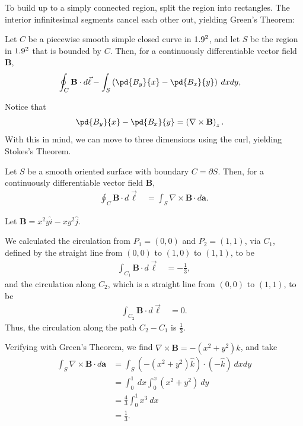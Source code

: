 \documentclass[10pt]{mypackage}
\begin{document}
To build up to a simply connected region, split the region into rectangles. The interior infinitesimal segments cancel each other out, yielding Green's Theorem:
\begin{theorem}
  Let $C$ be a piecewise smooth simple closed curve in $1.9^2$, and let $S$ be the region in $1.9^2$ that is bounded by $C$. Then, for a continuously differentiable vector field $\mathbf{B}$,
  \begin{align*}
    \oint_{C}^{} \mathbf{B}\cdot d\vec{\ell} &- \int_{S}^{} \left(\pd{B_y}{x} - \pd{B_x}{y}\right)\:dx dy,
  \end{align*}
\end{theorem}
Notice that
\begin{align*}
  \pd{B_y}{x} - \pd{B_x}{y} &= \left(\nabla \times \mathbf{B}\right)_{z}.
\end{align*}
With this in mind, we can move to three dimensions using the curl, yielding Stokes's Theorem.
\begin{theorem}
  Let $S$ be a smooth oriented surface with boundary $C = \partial S$. Then, for a continuously differentiable vector field $\mathbf{B}$,
  \begin{align*}
    \oint_{C}\mathbf{B}\cdot d\vec{\ell} &= \int_{S}^{} \nabla \times \mathbf{B}\cdot d\mathbf{a}.
  \end{align*}
\end{theorem}
\begin{example}
  Let $\mathbf{B} = x^2y \hat{i} - xy^2\hat{j}$.\newline

  We calculated the circulation from $P_1 = (0,0)$ and $P_2 = (1,1)$, via $C_1$, defined by the straight line from $(0,0)$ to $(1,0)$ to $(1,1)$, to be
  \begin{align*}
    \int_{C_1}^{} \mathbf{B}\cdot d\vec{\ell} &= -\frac{1}{3},
  \end{align*}
  and the circulation along $C_2$, which is a straight line from $(0,0)$ to $(1,1)$, to be
  \begin{align*}
    \int_{C_2}^{} \mathbf{B}\cdot d\vec{\ell} &= 0.
  \end{align*}
  Thus, the circulation along the path $C_2 - C_1$ is $\frac{1}{3}$.\newline

  Verifying with Green's Theorem, we find $\nabla \times \mathbf{B} = -\left(x^2 + y^2\right)\hat{k}$, and take
  \begin{align*}
    \int_{S}^{} \nabla \times \mathbf{B}\cdot d\mathbf{a} &= \int_{S}^{} \left(-\left(x^2 + y^2\right)\hat{k}\right)\cdot \left(-\hat{k}\right)\:dxdy\\
                                                          &= \int_{0}^{1} \:dx\int_{0}^{x} \left(x^2 + y^2\right)\:dy\\
                                                          &= \frac{4}{3}\int_{0}^{1} x^3\:dx\\
                                                          &= \frac{1}{3}.
  \end{align*}
\end{example}
\end{document}
